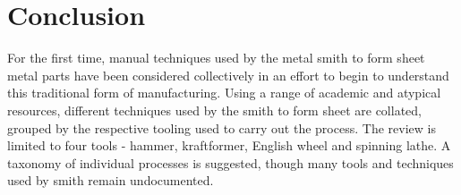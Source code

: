 

\section{Conclusion}

For the first time, manual techniques used by the metal smith to form sheet metal parts have been considered collectively in an effort to begin to understand this traditional form of manufacturing. Using a range of academic and atypical resources, different techniques used by the smith to form sheet are collated, grouped by the respective tooling used to carry out the process. The review is limited to four tools - hammer, kraftformer, English wheel and spinning lathe. A taxonomy of individual processes is suggested, though many tools and techniques used by smith remain undocumented.

